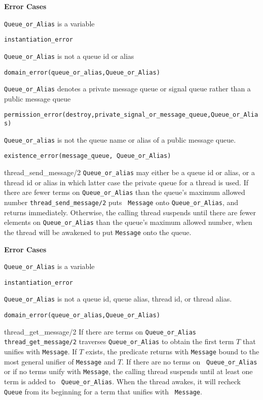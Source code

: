 \begin{description}
{\bf Error Cases}
\bi
\item 	{\tt Queue\_or\_Alias} is a variable
\bi
\item 	{\tt instantiation\_error}
\ei
%
\item 	{\tt Queue\_or\_Alias} is not a queue id or alias
\bi
\item 	{\tt domain\_error(queue\_or\_alias,Queue\_or\_Alias)}
\ei
\item {\tt Queue\_or\_Alias} denotes a private message queue or signal
  queue rather than a public message queue
\bi
\item {\tt permission\_error(destroy,private\_signal\_or\_message\_queue,Queue\_or\_Alias)}
\ei
\item {\tt Queue\_or\_alias} is not the queue name or alias of a
  public message queue.
\bi
\item {\tt existence\_error(message\_queue, Queue\_or\_Alias)}
\ei
\ei
%


{thread\_send\_message/2}
%
{\tt Queue\_or\_alias} may either be a queue id or alias, or a thread
id or alias in which latter case the private queue for a thread is
used.  If there are fewer terms on {\tt Queue\_or\_Alias} than the
queue's maximum allowed number {\tt thread\_send\_message/2} puts {\tt
  Message} onto {\tt Queue\_or\_Alias}, and returns immediately.
Otherwise, the calling thread suspends until there are fewer elements
on {\tt Queue\_or\_Alias} than the queue's maximum allowed number,
when the thread will be awakened to put {\tt Message} onto the queue.

{\bf Error Cases}
\bi
\item 	{\tt Queue\_or\_Alias} is a variable
\bi
\item 	{\tt instantiation\_error}
\ei
%
\item {\tt Queue\_or\_Alias} is not a queue id, queue alias, thread
  id, or thread alias.  
\bi
\item 	{\tt domain\_error(queue\_or\_alias,Queue\_or\_Alias)}
\ei
\ei
%

{thread\_get\_message/2}
%
If there are terms on {\tt Queue\_or\_Alias} {\tt
  thread\_get\_message/2} traverses {\tt Queue\_or\_Alias} to obtain
the first term $T$ that unifies with {\tt Message}.  If $T$ exists,
the predicate returns with {\tt Message} bound to the most general
unifier of {\tt Message} and $T$.  If there are no terms on {\tt
  Queue\_or\_Alias} or if no terms unify with {\tt Message}, the
calling thread suspends until at least one term is added to {\tt
  Queue\_or\_Alias}.  When the thread awakes, it will recheck {\tt
  Queue} from its beginning for a term that unifies with {\tt
  Message}.


\end{description}
